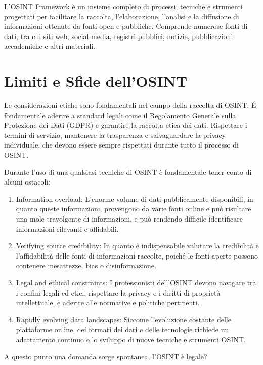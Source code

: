 L'OSINT Framework è un insieme completo di processi, tecniche e strumenti progettati per facilitare la raccolta, l'elaborazione, l'analisi e la diffusione di informazioni ottenute da fonti open e pubbliche. Comprende numerose fonti di dati, tra cui siti web, social media, registri pubblici, notizie, pubblicazioni accademiche e altri materiali.



\section{Limiti e Sfide dell'OSINT}\label{sec:cap_sec_osint5}

Le considerazioni etiche sono fondamentali nel campo della raccolta di OSINT. \'E fondamentale aderire a standard legali come il Regolamento Generale sulla Protezione dei Dati (GDPR) e garantire la raccolta etica dei dati. Rispettare i termini di servizio, mantenere la trasparenza e salvaguardare la privacy individuale, che devono essere sempre rispettati durante tutto il processo di OSINT.

Durante l'uso di una qualsiasi tecniche di OSINT è fondamentale tener conto di alcuni ostacoli:

\begin{enumerate}
    \item Information overload:  L'enorme volume di dati pubblicamente disponibili, in quanto queste informazioni, provengono da varie fonti online e può risultare una mole travolgente di informazioni, e può rendendo difficile identificare informazioni rilevanti e affidabili.
    \item Verifying source credibility: In quanto è indispensabile valutare la credibilità e l'affidabilità delle fonti di informazioni raccolte, poiché le fonti aperte possono contenere inesattezze, bias o disinformazione.
    \item Legal and ethical constraints: I professionisti dell'OSINT devono navigare tra i confini legali ed etici, rispettare la privacy e i diritti di proprietà intellettuale, e aderire alle normative e politiche pertinenti.
    \item Rapidly evolving data landscapes: Siccome l'evoluzione costante delle piattaforme online, dei formati dei dati e delle tecnologie richiede un adattamento continuo e lo sviluppo di nuove tecniche e strumenti OSINT.
\end{enumerate}

A questo punto una domanda sorge spontanea, l'OSINT è legale?

